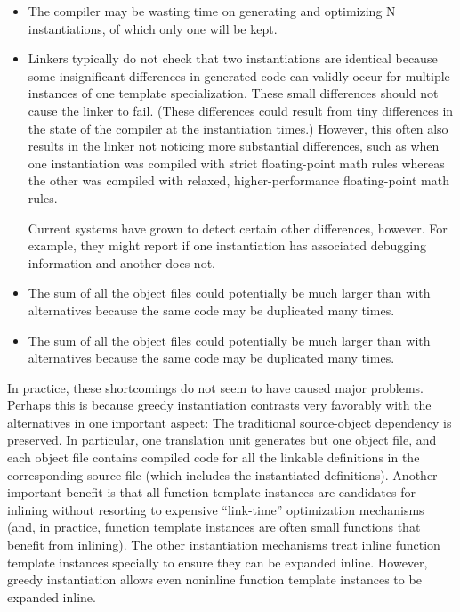 \begin{itemize}
\item 
The compiler may be wasting time on generating and optimizing N instantiations, of which only one will be kept.

\item 
Linkers typically do not check that two instantiations are identical because some insignificant differences in generated code can validly occur for multiple instances of one template specialization. These small differences should not cause the linker to fail. (These differences could result from tiny differences in the state of the compiler at the instantiation times.) However, this often also results in the linker not noticing more substantial differences, such as when one instantiation was compiled with strict floating-point math rules whereas the other was compiled with relaxed, higher-performance floating-point math rules.

\begin{tcolorbox}[colback=webgreen!5!white,colframe=webgreen!75!black]
\hspace*{0.75cm}Current systems have grown to detect certain other differences, however. For example, they might report if one instantiation has associated debugging information and another does not.
\end{tcolorbox}

\item 
The sum of all the object files could potentially be much larger than with alternatives because the same code may be duplicated many times.

\item 
The sum of all the object files could potentially be much larger than with alternatives because the same code may be duplicated many times.
\end{itemize}

In practice, these shortcomings do not seem to have caused major problems. Perhaps this is because greedy instantiation contrasts very favorably with the alternatives in one important aspect: The traditional source-object dependency is preserved. In particular, one translation unit generates but one object file, and each object file contains compiled code for all the linkable definitions in the corresponding source file (which includes the instantiated definitions). Another important benefit is that all function template instances are candidates for inlining without resorting to expensive “link-time” optimization mechanisms (and, in practice, function template instances are often small functions that benefit from inlining). The other instantiation mechanisms treat inline function template instances specially to ensure they can be expanded inline. However, greedy instantiation allows even noninline function template instances to be expanded inline.

